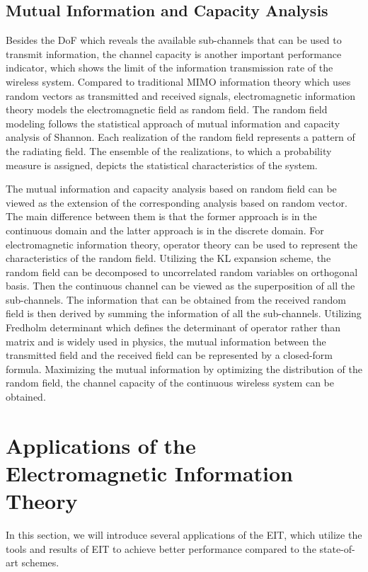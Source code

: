 \documentclass[journal,twocolumn]{IEEEtran}
\begin{document}
\subsection{Mutual Information and Capacity Analysis}
Besides the DoF which reveals the available sub-channels that can be used to transmit information, the channel capacity is another important performance indicator, which shows the limit of the information transmission rate of the wireless system. Compared to traditional MIMO information theory which uses random vectors as transmitted and received signals, electromagnetic information theory models the electromagnetic field as random field. The random field modeling follows the statistical approach of mutual information and capacity analysis of Shannon. Each realization of the random field represents a pattern of the radiating field. The ensemble of the realizations, to which a probability measure is assigned, depicts the statistical characteristics of the system. 

The mutual information and capacity analysis based on random field can be viewed as the extension of the corresponding analysis based on random vector. The main difference between them is that the former approach is in the continuous domain and the latter approach is in the discrete domain. For electromagnetic information theory, operator theory can be used to represent the characteristics of the random field. 
Utilizing the KL expansion scheme, the random field can be decomposed to uncorrelated random variables on orthogonal basis. Then the continuous channel can be viewed as the superposition of all the sub-channels. The information that can be obtained from the received random field is then derived by summing the information of all the sub-channels. Utilizing Fredholm determinant which defines the determinant of operator rather than matrix and is widely used in physics, the mutual information between the transmitted field and the received field can be represented by a closed-form formula. Maximizing the mutual information by optimizing the distribution of the random field, the channel capacity of the continuous wireless system can be obtained. 

\section{Applications of the Electromagnetic Information Theory}
In this section, we will introduce several applications of the EIT, which utilize the tools and results of EIT to achieve better performance compared to the state-of-art schemes.
\end{document}

